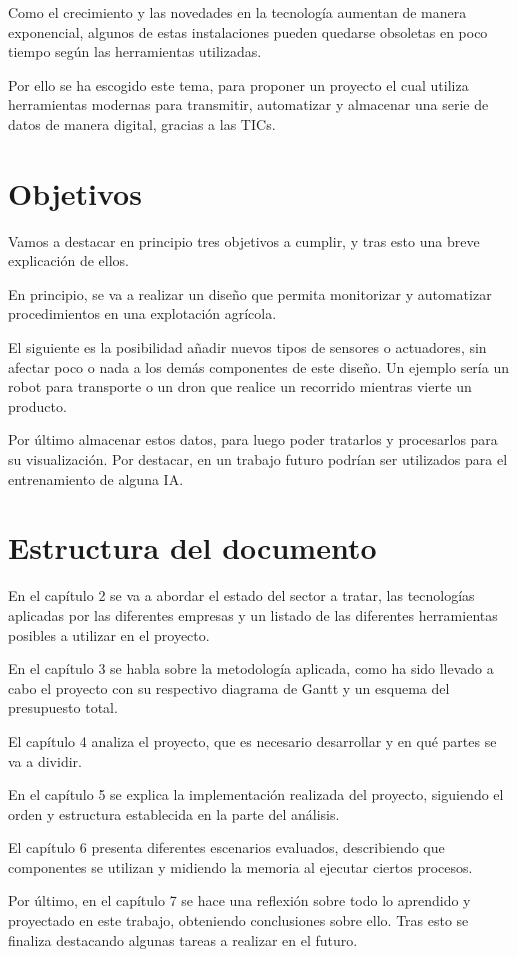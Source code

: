 Como el crecimiento y las novedades en la tecnología aumentan de manera exponencial, algunos de estas instalaciones pueden quedarse obsoletas en poco tiempo según las herramientas utilizadas.

Por ello se ha escogido este tema, para proponer un proyecto el cual utiliza herramientas modernas para transmitir, automatizar y almacenar una serie de datos de manera digital, gracias a las \ac{TICs}.

\section{Objetivos}

Vamos a destacar en principio tres objetivos a cumplir, y tras esto una breve explicación de ellos.

En principio, se va a realizar un diseño que permita monitorizar y automatizar procedimientos en una explotación agrícola.

El siguiente es la posibilidad añadir nuevos tipos de sensores o actuadores, sin afectar poco o nada a los demás componentes de este diseño. Un ejemplo sería un robot para transporte o un dron que realice un recorrido mientras vierte un producto.

Por último almacenar estos datos, para luego poder tratarlos y procesarlos para su visualización. Por destacar, en un trabajo futuro podrían ser utilizados para el entrenamiento de alguna \ac{IA}.

\section{Estructura del documento}

En el capítulo 2 se va a abordar el estado del sector a tratar, las tecnologías aplicadas por las diferentes empresas y un listado de las diferentes herramientas posibles a utilizar en el proyecto.

En el capítulo 3 se habla sobre la metodología aplicada, como ha sido llevado a cabo el proyecto con su respectivo diagrama de Gantt y un esquema del presupuesto total.

El capítulo 4 analiza el proyecto, que es necesario desarrollar y en qué partes se va a dividir.

En el capítulo 5 se explica la implementación realizada del proyecto, siguiendo el orden y estructura establecida en la parte del análisis.

El capítulo 6 presenta diferentes escenarios evaluados, describiendo que componentes se utilizan y midiendo la memoria al ejecutar ciertos procesos.

Por último, en el capítulo 7 se hace una reflexión sobre todo lo aprendido y proyectado en este trabajo, obteniendo conclusiones sobre ello. Tras esto se finaliza destacando algunas tareas a realizar en el futuro.